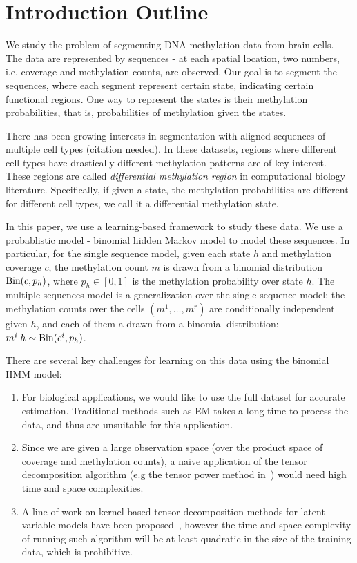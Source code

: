\section{Introduction Outline}

We study the problem of segmenting DNA methylation data from brain cells. The data are represented by sequences - at each spatial location, two numbers, i.e. coverage and methylation counts, are observed.
Our goal is to segment the sequences, where each segment represent certain state, indicating certain functional regions. One way to represent the states is their methylation probabilities, that is, probabilities of methylation given the states.

There has been growing interests in segmentation with aligned sequences of multiple cell types (citation needed). In these datasets, regions where different cell types have drastically different methylation patterns are of key interest. These regions are called {\em differential methylation region} in computational biology literature. Specifically, if given a state, the methylation probabilities are different for different cell types, we call it a differential methylation state.

In this paper, we use a learning-based framework to study these data. We use a probablistic model - binomial hidden Markov model to model these sequences. In particular, for the single sequence model, given each state $h$ and methylation coverage $c$, the methylation count $m$ is drawn from a binomial distribution $\text{Bin}(c,p_h)$, where $p_h \in [0,1]$ is the methylation probability over state $h$. The multiple sequences model is a generalization over the single sequence model: the methylation counts over the cells $(m^1, \ldots, m^r)$ are conditionally independent given $h$, and each of them a drawn from a binomial distribution: $m^i | h \sim \text{Bin}(c^i,p_h)$.

There are several key challenges for learning on this data using the binomial HMM model:
\begin{enumerate}
\item For biological applications, we would like to use the full dataset for accurate estimation. Traditional methods such as EM takes a long time to process the data, and thus are unsuitable for this application.
\item Since we are given a large observation space (over the product space of coverage and methylation counts), a naive application of the tensor decomposition algorithm (e.g the tensor power method in~\cite{AGHKT12}) would need high time and space complexities.
\item A line of work on kernel-based tensor decomposition methods for latent variable models have been proposed~\cite{SADX14}, however the time and space complexity of running such algorithm will be at least quadratic in the size of the training data, which is prohibitive.
\end{enumerate}

